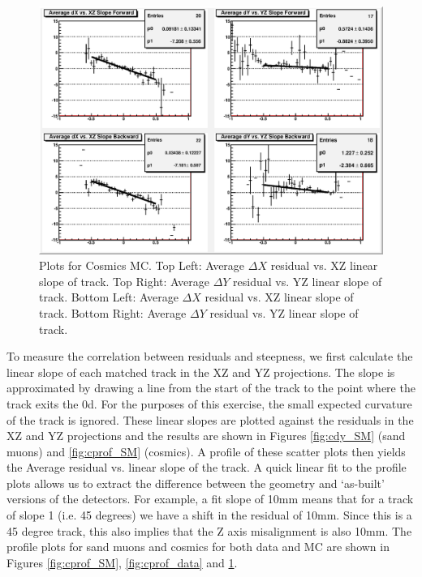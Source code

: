 \begin{figure}
  \centering
  \includegraphics[width=6in]{Figures/Appendix/cprof_mc.eps}
  \caption{Plots for Cosmics MC. Top Left: Average $\Delta X$ residual vs. XZ linear slope of track. Top Right: Average $\Delta Y$ residual vs. YZ linear slope of track. Bottom Left: Average $\Delta X$ residual vs. XZ linear slope of track. Bottom Right: Average $\Delta Y$ residual vs. YZ linear slope of track.} 
  \label{fig:cprof_mc}%
\end{figure}



To measure the correlation between residuals and steepness, we first calculate the linear slope of each matched track in the XZ and YZ projections. The slope is approximated by drawing a line from the start of the track to the point where the track exits the \p0d. For the purposes of this exercise, the small expected curvature of the track is ignored. These linear slopes are plotted against the residuals in the XZ and YZ projections and the results are shown in Figures \ref{fig:cdy_SM} (sand muons) and \ref{fig:cprof_SM} (cosmics). A profile of these scatter plots then yields the Average residual vs. linear slope of the track. A quick linear fit to the profile plots allows us to extract the difference between the geometry and `as-built' versions of the detectors. For example, a fit slope of 10mm means that for a track of slope 1 (i.e. 45 degrees) we have a shift in the residual of 10mm. Since this is a 45 degree track, this also implies that the Z axis misalignment is also 10mm. The profile plots for sand muons and cosmics for both data and MC are shown in Figures \ref{fig:cprof_SM}, \ref{fig:cprof_data} and \ref{fig:cprof_mc}.

